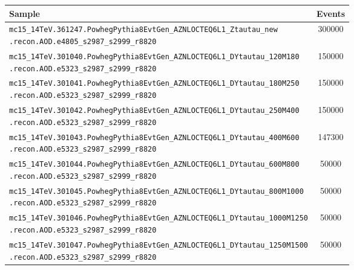 \noindent
\begin{minipage}{\textwidth}
  \captionsetup{type=table}
  \centering
  {\small
  \begin{tabular}{p{13cm}S[table-format=6.0]}
    \toprule
    Sample & {Events} \\
    \midrule
    \texttt{mc15\_14TeV.361247.PowhegPythia8EvtGen\_AZNLOCTEQ6L1\_Ztautau\_new\newline\hspace*{1em}.recon.AOD.e4805\_s2987\_s2999\_r8820} & 300000 \\
    \texttt{mc15\_14TeV.301040.PowhegPythia8EvtGen\_AZNLOCTEQ6L1\_DYtautau\_120M180\newline\hspace*{1em}.recon.AOD.e5323\_s2987\_s2999\_r8820} & 150000 \\
    \texttt{mc15\_14TeV.301041.PowhegPythia8EvtGen\_AZNLOCTEQ6L1\_DYtautau\_180M250\newline\hspace*{1em}.recon.AOD.e5323\_s2987\_s2999\_r8820} & 150000 \\
    \texttt{mc15\_14TeV.301042.PowhegPythia8EvtGen\_AZNLOCTEQ6L1\_DYtautau\_250M400\newline\hspace*{1em}.recon.AOD.e5323\_s2987\_s2999\_r8820} & 150000 \\
    \texttt{mc15\_14TeV.301043.PowhegPythia8EvtGen\_AZNLOCTEQ6L1\_DYtautau\_400M600\newline\hspace*{1em}.recon.AOD.e5323\_s2987\_s2999\_r8820} & 147300 \\
    \texttt{mc15\_14TeV.301044.PowhegPythia8EvtGen\_AZNLOCTEQ6L1\_DYtautau\_600M800\newline\hspace*{1em}.recon.AOD.e5323\_s2987\_s2999\_r8820} & 50000 \\
    \texttt{mc15\_14TeV.301045.PowhegPythia8EvtGen\_AZNLOCTEQ6L1\_DYtautau\_800M1000\newline\hspace*{1em}.recon.AOD.e5323\_s2987\_s2999\_r8820} & 50000 \\
    \texttt{mc15\_14TeV.301046.PowhegPythia8EvtGen\_AZNLOCTEQ6L1\_DYtautau\_1000M1250\newline\hspace*{1em}.recon.AOD.e5323\_s2987\_s2999\_r8820} & 50000 \\
    \texttt{mc15\_14TeV.301047.PowhegPythia8EvtGen\_AZNLOCTEQ6L1\_DYtautau\_1250M1500\newline\hspace*{1em}.recon.AOD.e5323\_s2987\_s2999\_r8820} & 50000 \\

\end{tabular}}
\end{minipage}
